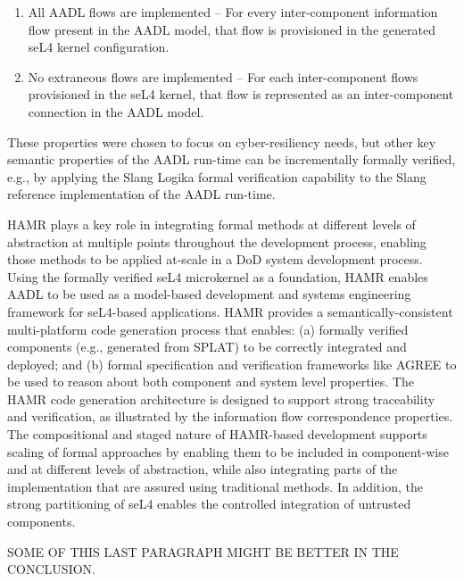 \begin{enumerate}
\item All AADL flows are implemented -- For every inter-component information
flow present in the AADL model, that flow is provisioned in the
generated seL4 kernel configuration.
\item No extraneous flows are implemented -- For
each inter-component flows provisioned in the seL4 kernel, that
flow is represented as an inter-component connection in the
AADL model.   
\end{enumerate}
These properties were chosen to focus on
cyber-resiliency needs, but other
key semantic properties of the AADL run-time can be incrementally
formally verified, e.g., by applying the Slang Logika formal
verification capability to the Slang reference implementation of the
AADL run-time.  

HAMR plays a key role in integrating formal methods
at different levels of abstraction at multiple points throughout
the development process, enabling those methods to be applied
at-scale in a DoD system development process.   Using the
formally verified seL4 microkernel as a foundation, HAMR enables
AADL to be used as a model-based development and systems
engineering framework for seL4-based applications.
HAMR provides a semantically-consistent multi-platform code
generation process that enables: (a) formally verified components
(e.g., generated from SPLAT) to be correctly integrated and
deployed; and (b) formal specification and verification frameworks
like AGREE to be used to reason about both component and system
level properties.   The HAMR code generation architecture is
designed to support strong traceability and verification, as
illustrated by the information flow correspondence properties.  
The compositional and staged nature
of HAMR-based development supports scaling of formal approaches
by enabling them to be included in component-wise and at
different levels of abstraction, while
also integrating parts of the implementation that are assured
using traditional methods.   In addition, the strong partitioning
of seL4 enables the controlled integration of untrusted components.

SOME OF THIS LAST PARAGRAPH MIGHT BE BETTER IN THE CONCLUSION.


